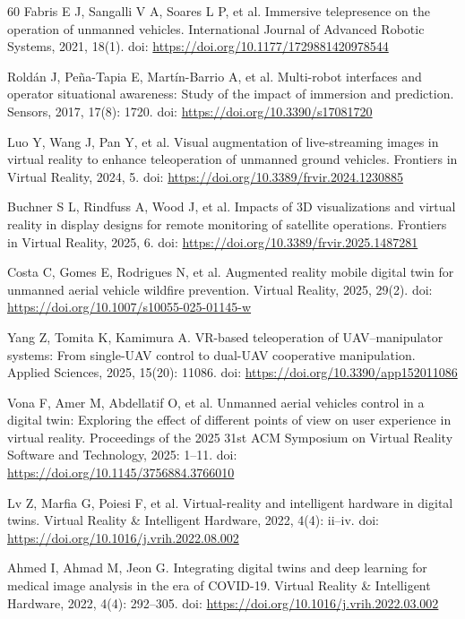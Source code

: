 \documentclass[fleqn]{VRIH2025}
\begin{document}
\begin{thebibliography}{60}
Fabris E J, Sangalli V A, Soares L P, et al. Immersive telepresence on the operation of unmanned vehicles. International Journal of Advanced Robotic Systems, 2021, 18(1). doi: \url{https://doi.org/10.1177/1729881420978544}

Rold\'an J, Pe\~na-Tapia E, Mart\'in-Barrio A, et al. Multi-robot interfaces and operator situational awareness: Study of the impact of immersion and prediction. Sensors, 2017, 17(8): 1720. doi: \url{https://doi.org/10.3390/s17081720}

Luo Y, Wang J, Pan Y, et al. Visual augmentation of live-streaming images in virtual reality to enhance teleoperation of unmanned ground vehicles. Frontiers in Virtual Reality, 2024, 5. doi: \url{https://doi.org/10.3389/frvir.2024.1230885}

Buchner S L, Rindfuss A, Wood J, et al. Impacts of 3D visualizations and virtual reality in display designs for remote monitoring of satellite operations. Frontiers in Virtual Reality, 2025, 6. doi: \url{https://doi.org/10.3389/frvir.2025.1487281}

Costa C, Gomes E, Rodrigues N, et al. Augmented reality mobile digital twin for unmanned aerial vehicle wildfire prevention. Virtual Reality, 2025, 29(2). doi: \url{https://doi.org/10.1007/s10055-025-01145-w}

Yang Z, Tomita K, Kamimura A. VR-based teleoperation of UAV--manipulator systems: From single-UAV control to dual-UAV cooperative manipulation. Applied Sciences, 2025, 15(20): 11086. doi: \url{https://doi.org/10.3390/app152011086}

Vona F, Amer M, Abdellatif O, et al. Unmanned aerial vehicles control in a digital twin: Exploring the effect of different points of view on user experience in virtual reality. Proceedings of the 2025 31st ACM Symposium on Virtual Reality Software and Technology, 2025: 1--11. doi: \url{https://doi.org/10.1145/3756884.3766010}

Lv Z, Marfia G, Poiesi F, et al. Virtual-reality and intelligent hardware in digital twins. Virtual Reality \& Intelligent Hardware, 2022, 4(4): ii--iv. doi: \url{https://doi.org/10.1016/j.vrih.2022.08.002}

Ahmed I, Ahmad M, Jeon G. Integrating digital twins and deep learning for medical image analysis in the era of COVID-19. Virtual Reality \& Intelligent Hardware, 2022, 4(4): 292--305. doi: \url{https://doi.org/10.1016/j.vrih.2022.03.002}


\end{thebibliography}
\end{document}
